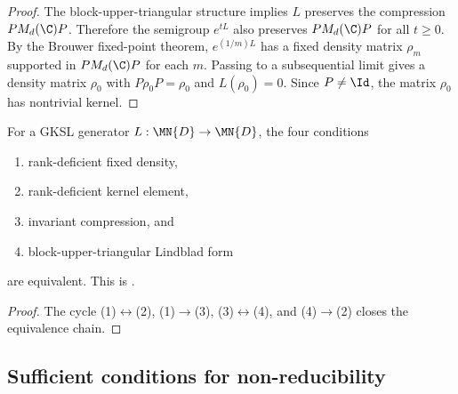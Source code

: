 \begin{proof}
    \leanok
    The block-upper-triangular structure implies $L$ preserves the
    compression $P M_d(\C) P$.
    Therefore the semigroup $e^{tL}$ also preserves $P M_d(\C) P$
    for all $t \ge 0$.
    By the Brouwer fixed-point theorem, $e^{(1/m)L}$ has a fixed
    density matrix $\rho_m$ supported in $P M_d(\C) P$ for each $m$.
    Passing to a subsequential limit gives a density matrix
    $\rho_0$ with $P \rho_0 P = \rho_0$ and $L(\rho_0) = 0$.
    Since $P \neq \Id$, the matrix $\rho_0$ has nontrivial kernel.
\end{proof}

\begin{theorem}
    \label{thm:wolf_prop_7_6_full}
    \leanok
    For a GKSL generator $L : \MN{D} \to \MN{D}$, the four conditions
    \begin{enumerate}
        \item rank-deficient fixed density,
        \item rank-deficient kernel element,
        \item invariant compression, and
        \item block-upper-triangular Lindblad form
    \end{enumerate}
    are equivalent.
    This is \cite[Proposition~7.6]{Wolf2012Quantum}.
\end{theorem}

\begin{proof}\leanok
    The cycle (1)$\leftrightarrow$(2), (1)$\to$(3),
    (3)$\leftrightarrow$(4), and (4)$\to$(2) closes
    the equivalence chain.
\end{proof}


\subsection{Sufficient conditions for non-reducibility}
\label{sec:cor_7_2_sufficient_conditions}

